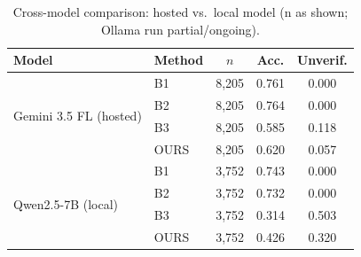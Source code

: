 \begin{table}[t]
\centering
\caption{Cross-model comparison: hosted vs.\ local model (n as shown; Ollama run partial/ongoing).}
\label{tab:cross-model}
\footnotesize
\begin{tabular}{llccc}
\toprule
Model & Method & $n$ & Acc. & Unverif. \\
\midrule
\multirow{4}{*}{Gemini 3.5 FL (hosted)}
 & B1 & 8,205 & 0.761 & 0.000 \\
 & B2 & 8,205 & 0.764 & 0.000 \\
 & B3 & 8,205 & 0.585 & 0.118 \\
 & OURS & 8,205 & 0.620 & 0.057 \\
\midrule
\multirow{4}{*}{Qwen2.5-7B (local)}
 & B1 & 3,752 & 0.743 & 0.000 \\
 & B2 & 3,752 & 0.732 & 0.000 \\
 & B3 & 3,752 & 0.314 & 0.503 \\
 & OURS & 3,752 & 0.426 & 0.320 \\
\bottomrule
\end{tabular}
\end{table}
